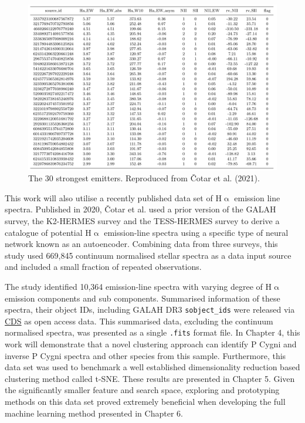 \begin{figure}[!htb]
\centering
\includegraphics[scale=.45]{figures/cotartable.png}
\caption{The 30 strongest emitters. Reproduced from Čotar et al. (2021)\cite{vcotar2021galah}.}
\end{figure}

This work will also utilise a recently published data set of H$\upalpha$ emission line spectra. Published in 2020, Čotar et al.\cite{vcotar2021galah} used a prior version of the GALAH survey\cite{de2015galah}, the K2-HERMES survey\cite{wittenmyer2018k2} and the TESS-HERMES survey\cite{sharma2018tess} to derive a catalogue of potential H$\upalpha$ emission-line spectra using a specific type of neural network known as an autoencoder. Combining data from three surveys, this study used 669,845 continuum normalised stellar spectra as a data input source and included a small fraction of repeated observations. 

The study identified 10,364 emission-line spectra with varying degree of H$\upalpha$ emission components and sub components. Summarised information of these spectra, their object IDs, including GALAH DR3 \texttt{sobject\_ids} were released via \href{https://cdsweb.u-strasbg.fr/}{CDS} as open access data. This summarised data, excluding the continuum normalised spectra, was presented as a single \texttt{.fits} format file. In Chapter 4, this work will demonstrate that a novel clustering approach can identify P Cygni and inverse P Cygni spectra and other species from this sample. Furthermore, this data set was used to benchmark a well established dimensionality reduction based clustering method called t-SNE. These results are presented in Chapter 5. Given the significantly smaller feature and search space, exploring and prototyping methods on this data set proved extremely beneficial when developing the full machine learning method presented in Chapter 6.

